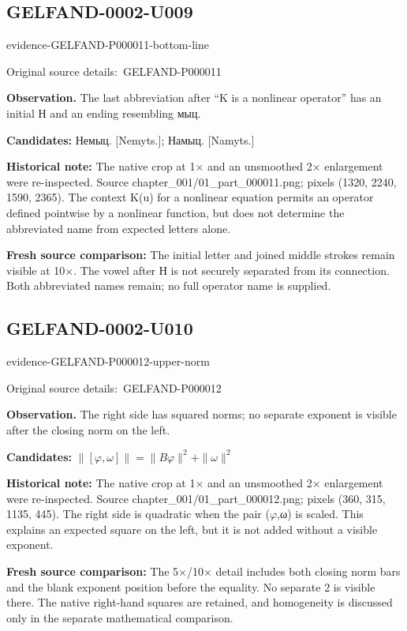\documentclass[11pt]{article}
\newcommand{\EvidenceBlock}[4]{%
 \par\smallskip\noindent\begin{minipage}{\linewidth}
 \begin{minipage}[t]{.47\linewidth}\vspace{0pt}\centering
 \csname evidence-#1-#2\endcsname\par
 {\scriptsize\SourceCropCaption\ #1}\par
 \end{minipage}\hfill
 \begin{minipage}[t]{.49\linewidth}\vspace{0pt}\raggedright
 {\small\color{orange!65!black}\textbf{#4} #3}\par
 \end{minipage}
 \end{minipage}\par\smallskip}
\newcommand{\SourceCropCaption}{Original source details:}\newcommand{\ReadingCaption}{Uncertain reading.}\newcommand{\IncompleteCaption}{Undeciphered passage.}\newcommand{\DiagramCaption}{Diagram and typed description.}
\begin{document}
\subsection*{GELFAND-0002-U009}
\EvidenceBlock{GELFAND-P000011}{bottom-line}{The last abbreviation after “K is a nonlinear operator” has an initial Н and an ending resembling мыц.}{Observation.}
\par\smallskip\noindent\textbf{Candidates: } Немыц. [Nemyts.]; Намыц. [Namyts.]\par
\par\smallskip\noindent\textbf{Historical note: } The native crop at 1× and an unsmoothed 2× enlargement were re-inspected. Source chapter\_001/01\_part\_000011.png; pixels (1320, 2240, 1590, 2365). The context K(u) for a nonlinear equation permits an operator defined pointwise by a nonlinear function, but does not determine the abbreviated name from expected letters alone.\par
\par\smallskip\noindent\textbf{Fresh source comparison: } The initial letter and joined middle strokes remain visible at 10×. The vowel after Н is not securely separated from its connection. Both abbreviated names remain; no full operator name is supplied.\par

\subsection*{GELFAND-0002-U010}
\EvidenceBlock{GELFAND-P000012}{upper-norm}{The right side has squared norms; no separate exponent is visible after the closing norm on the left.}{Observation.}
\par\smallskip\noindent\textbf{Candidates: } \(\|[\varphi,\omega]\|=\|B\varphi\|^2+\|\omega\|^2\)\par
\par\smallskip\noindent\textbf{Historical note: } The native crop at 1× and an unsmoothed 2× enlargement were re-inspected. Source chapter\_001/01\_part\_000012.png; pixels (360, 315, 1135, 445). The right side is quadratic when the pair (\(\varphi\),ω) is scaled. This explains an expected square on the left, but it is not added without a visible exponent.\par
\par\smallskip\noindent\textbf{Fresh source comparison: } The 5×/10× detail includes both closing norm bars and the blank exponent position before the equality. No separate 2 is visible there. The native right-hand squares are retained, and homogeneity is discussed only in the separate mathematical comparison.\par
\end{document}
